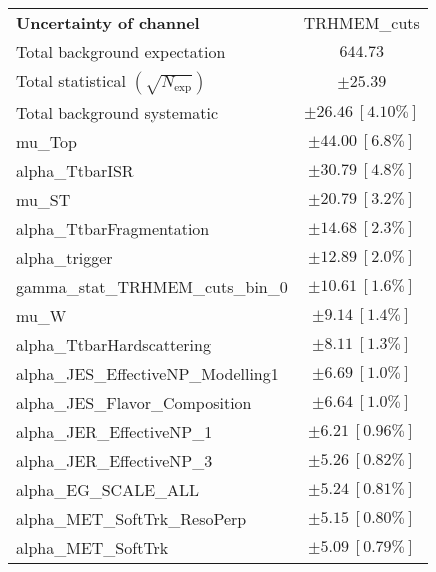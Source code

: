 
\begin{table}
\begin{center}
\setlength{\tabcolsep}{0.0pc}
\begin{tabular*}{\textwidth}{@{\extracolsep{\fill}}lc}
\noalign{\smallskip}\hline\noalign{\smallskip}
{\textbf{Uncertainty of channel}}                                    & TRHMEM\_cuts            \\
\noalign{\smallskip}\hline\noalign{\smallskip}
Total background expectation             &  $644.73$       \\
\noalign{\smallskip}\hline\noalign{\smallskip}
Total statistical $(\sqrt{N_{\mathrm{exp}}})$              & $\pm 25.39$       \\
Total background systematic               & $\pm 26.46\ [4.10\%] $             \\
\noalign{\smallskip}\hline\noalign{\smallskip}
\noalign{\smallskip}\hline\noalign{\smallskip}
mu\_Top         & $\pm 44.00\ [6.8\%] $       \\
alpha\_TtbarISR         & $\pm 30.79\ [4.8\%] $       \\
mu\_ST         & $\pm 20.79\ [3.2\%] $       \\
alpha\_TtbarFragmentation         & $\pm 14.68\ [2.3\%] $       \\
alpha\_trigger         & $\pm 12.89\ [2.0\%] $       \\
gamma\_stat\_TRHMEM\_cuts\_bin\_0         & $\pm 10.61\ [1.6\%] $       \\
mu\_W         & $\pm 9.14\ [1.4\%] $       \\
alpha\_TtbarHardscattering         & $\pm 8.11\ [1.3\%] $       \\
alpha\_JES\_EffectiveNP\_Modelling1         & $\pm 6.69\ [1.0\%] $       \\
alpha\_JES\_Flavor\_Composition         & $\pm 6.64\ [1.0\%] $       \\
alpha\_JER\_EffectiveNP\_1         & $\pm 6.21\ [0.96\%] $       \\
alpha\_JER\_EffectiveNP\_3         & $\pm 5.26\ [0.82\%] $       \\
alpha\_EG\_SCALE\_ALL         & $\pm 5.24\ [0.81\%] $       \\
alpha\_MET\_SoftTrk\_ResoPerp         & $\pm 5.15\ [0.80\%] $       \\
alpha\_MET\_SoftTrk         & $\pm 5.09\ [0.79\%] $       \\

\end{tabular*}
\end{center}
\end{table}
